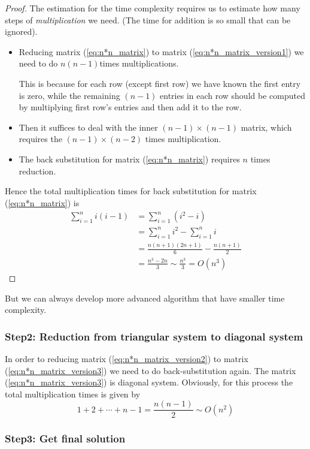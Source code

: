 \begin{proof}
The estimation for the time complexity requires us to estimate how many steps of \emph{multiplication} we need. (The time for addition is so small that can be ignored).
\begin{itemize}
\item
Reducing matrix (\ref{eq:n*n_matrix}) to matrix (\ref{eq:n*n_matrix_version1}) we need to do $n(n-1)$times multiplications.

This is because for each row (except first row) we have known the first entry is zero, while the remaining $(n-1)$ entries in each row should be computed by multiplying first row's entries and then add it to the row.
\item
Then it suffices to deal with the inner $(n-1)\times (n-1)$ matrix, which requires the $(n-1)\times (n-2)$ times multiplication.
\item
The back substitution for matrix (\ref{eq:n*n_matrix}) requires $n$ times reduction.
\end{itemize}
Hence the total multiplication times for back substitution for matrix (\ref{eq:n*n_matrix}) is
\begin{equation*}
\begin{split}
\sum_{i=1}^n i(i-1)
	&= \sum_{i=1}^n (i^2-i)  \\
 		&=\sum_{i=1}^n i^2 - \sum_{i=1}^n i \\
		&=\frac{n(n+1)(2n+1)}{6} - \frac{n(n+1)}{2} \\
		&=\frac{n^3-2n}{3} \sim \frac{n^3}{3} =O(n^3)
\end{split}
\end{equation*}
\end{proof}
But we can always develop more advanced algorithm that have smaller time complexity.

\subsubsection{Step2: Reduction from triangular system to diagonal system}

In order to reducing matrix (\ref{eq:n*n_matrix_version2}) to matrix (\ref{eq:n*n_matrix_version3}) we need to do back-substitution again. The matrix (\ref{eq:n*n_matrix_version3}) is diagonal system. Obviously, for this process the total multiplication times is given by
\[
1+2+\cdots+n-1 = \frac{n(n-1)}{2} \sim O(n^2)
\]
\subsubsection{Step3: Get final solution}


